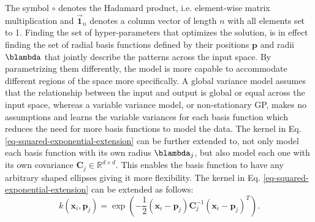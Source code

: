 \documentclass[useAMS,usenatbib,fleqn]{mn2e}
\begin{document}
The symbol $\circ$ denotes the Hadamard product, i.e. element-wise matrix multiplication and $\vec{\mathbf{1}}_{n}$ denotes a column vector of length $n$ with all elements set to 1. Finding the set of hyper-parameters that optimizes the solution, is in effect finding the set of radial basis functions defined by their positions $\mathbf{p}$ and radii $\blambda$ that jointly describe the patterns across the input space. By parametrizing them differently, the model is more capable to accommodate different regions of the space more specifically. A global variance model assumes that the relationship between the input and output is global or equal across the input space, whereas a variable variance model, or non-stationary GP, makes no assumptions and learns the variable variances for each basis function which reduces the need for more basis functions to model the data. The kernel in Eq. \eqref{eq-squared-exponential-extension} can be further extended to, not only model each basis function with its own radius $\blambda_{j}$, but also model each one with its own covariance $\mathbf{C}_{j} \in \mathbb{R}^{d\times d}$. This enables the basis function to have any arbitrary shaped ellipses giving it more flexibility. The kernel in Eq. \eqref{eq-squared-exponential-extension} can be extended as follows:
\begin{equation}
\label{eq-squared-exponential-covariance-extension}
k(\mathbf{x}_{i},\mathbf{p}_{j}) = \exp{\left(-\frac{1}{2}\left(\mathbf{x}_{i}-\mathbf{p}_{j}\right)\mathbf{C}_{j}^{-1}\left(\mathbf{x}_{i}-\mathbf{p}_{j}\right)^{T}\right)}.
\end{equation}
\end{document}

